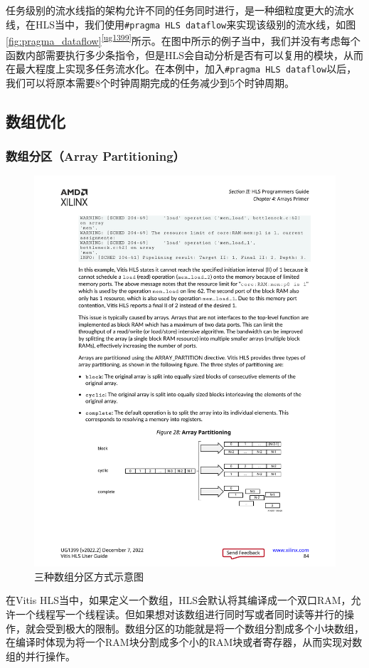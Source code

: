任务级别的流水线指的架构允许不同的任务同时进行，是一种细粒度更大的流水线，在HLS当中，我们使用\verb|#pragma HLS dataflow|来实现该级别的流水线，如图\ref{fig:pragma_dataflow}\textsuperscript{\ref {ug1399}}所示。在图中所示的例子当中，我们并没有考虑每个函数内部需要执行多少条指令，但是HLS会自动分析是否有可以复用的模块，从而在最大程度上实现多任务流水化。在本例中，加入\verb|#pragma HLS dataflow|以后，我们可以将原本需要8个时钟周期完成的任务减少到5个时钟周期。

\subsection{数组优化}
\subsubsection{数组分区（Array Partitioning）}
\begin{figure}[htbp]
    \centering
    \includegraphics[width=\linewidth]{figures/array_partitioning.pdf}
    \caption{三种数组分区方式示意图}
    \label{fig:array_partitioning}
\end{figure}
在Vitis HLS当中，如果定义一个数组，HLS会默认将其编译成一个双口RAM，允许一个线程写一个线程读。但如果想对该数组进行同时写或者同时读等并行的操作，就会受到极大的限制。数组分区的功能就是将一个数组分割成多个小块数组，在编译时体现为将一个RAM块分割成多个小的RAM块或者寄存器，从而实现对数组的并行操作。

